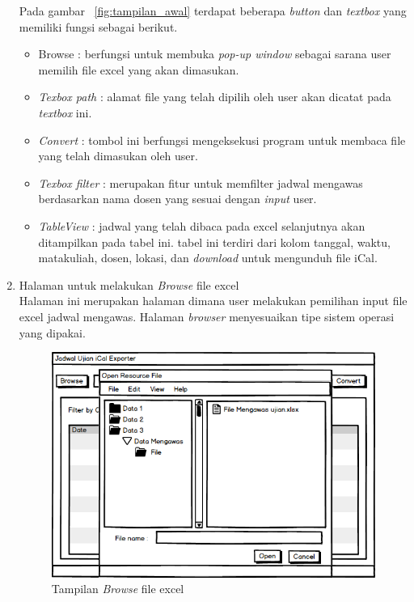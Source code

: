 \begin{enumerate}
		Pada gambar ~\ref{fig:tampilan_awal} terdapat beberapa \textit{button} dan \textit{textbox} yang memiliki fungsi sebagai berikut.
		\begin{itemize}
			\item \textit{}{Browse} : berfungsi untuk membuka \textit{pop-up window} sebagai sarana user memilih file excel yang akan dimasukan.
			\item \textit{Texbox path} : alamat file yang telah dipilih oleh user akan dicatat pada \textit{textbox} ini.
			\item \textit{Convert} : tombol ini berfungsi mengeksekusi program untuk membaca file yang telah dimasukan oleh user.
			\item \textit{Texbox filter} : merupakan fitur untuk memfilter jadwal mengawas berdasarkan nama dosen yang sesuai dengan \textit{input} user.
			\item \textit{TableView} : jadwal yang telah dibaca pada excel selanjutnya akan ditampilkan pada tabel ini. tabel ini terdiri dari kolom tanggal, waktu, matakuliah, dosen, lokasi, dan \textit{download} untuk mengunduh file iCal.		
		\end{itemize}
	\item Halaman untuk melakukan \textit{Browse} file excel\\
	Halaman ini merupakan halaman dimana user melakukan pemilihan input file excel jadwal mengawas. Halaman \textit{browser} menyesuaikan tipe sistem operasi yang dipakai.
		\begin{figure}[H]
		\centering
		\includegraphics[scale=0.5]{Gambar/antarmuka3}
		\caption{Tampilan \textit{Browse} file excel}
		\label{fig:browse}
		\end{figure}

\end{enumerate}

